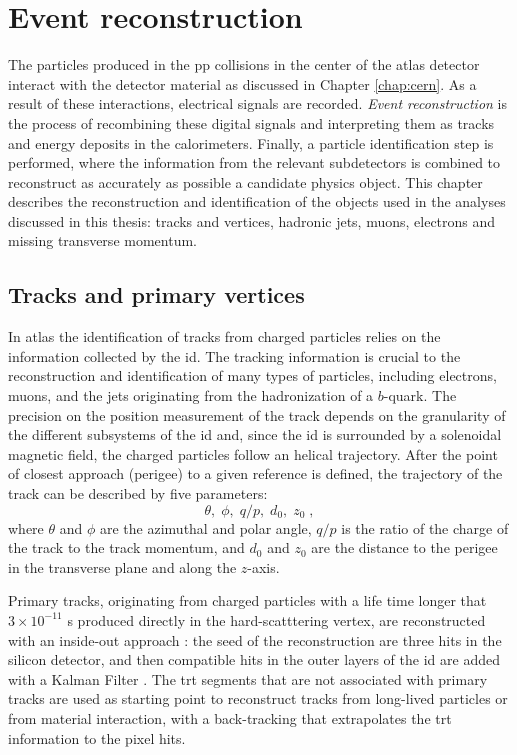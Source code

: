 \chapter{Event reconstruction}
\label{sec:event:reco}

The particles produced in the \gls{pp} collisions in the center of the \gls{atlas} detector interact with the detector material as discussed in Chapter \ref{chap:cern}. As a result of these interactions, electrical signals are recorded. \textit{Event reconstruction} is the process of recombining these digital signals and interpreting them as tracks and energy deposits in the calorimeters. Finally, a particle identification step
is performed, where the information from the relevant subdetectors is combined to reconstruct as accurately
as possible a candidate physics object.
This chapter describes the reconstruction and identification of the objects used in the analyses discussed in this thesis: tracks and vertices, hadronic jets, muons, electrons and missing transverse momentum. 


\section{Tracks and primary vertices}
\label{sec:reco:tracks}

In \gls{atlas} the identification of tracks from charged particles relies on the information collected by the \gls{id}. The tracking information is crucial to the reconstruction and identification of many types of particles, including electrons, muons, and the jets originating from the hadronization of a $b$-quark. The precision on the position measurement of the track depends on the granularity of the different subsystems of the \gls{id} and, since the \gls{id} is surrounded by a solenoidal magnetic field, the charged particles follow an helical trajectory. After the point of closest approach (perigee) to a given reference is defined, the trajectory of the track can be described by five parameters: 
\begin{equation}
\theta, \; \phi, \; q/p, \; d_0, \; z_0 \;,
\end{equation}
\noindent where $\theta$ and $\phi$ are the azimuthal and polar angle, $q/p$ is the ratio of the charge of the track to the track momentum, and $d_0$ and $z_0$ are the distance to the perigee in the transverse plane and along the $z$-axis. 

Primary tracks, originating from charged particles with a life time longer that $3 \times 10^{-11}$ s produced directly in the hard-scatttering vertex, are reconstructed with an inside-out approach \cite{Cornelissen:1020106}: the seed of the reconstruction are three hits in the silicon detector, and then compatible hits in the outer layers of the \gls{id} are added with a Kalman Filter \cite{citeulike:347166,Fruhwirth:1987fm}. The \gls{trt} segments that are not associated with primary tracks are used as starting point to reconstruct tracks from long-lived particles or from material interaction, with a back-tracking that extrapolates the \gls{trt} information to the pixel hits. 

